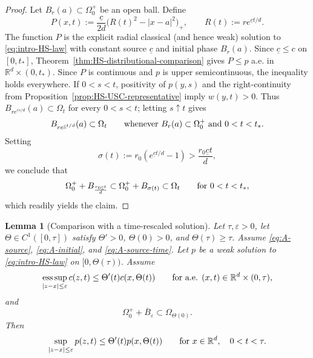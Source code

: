 \documentclass[11pt]{amsart}
\numberwithin{equation}{section}
\numberwithin{figure}{section}
\theoremstyle{plain}
\newtheorem{lem}[thm]{Lemma}
\theoremstyle{definition}
\theoremstyle{remark}
\theoremstyle{plain}
\newcommand{\abs}[1]{\lvert #1 \rvert}
\newcommand{\vep}{\varepsilon}
\def\R{\mathbb{R}}
\begin{document}
\begin{proof}
Let \(B_r(a)\subset\Omega_0^{+}\) be an open ball.  Define
\begin{equation}\label{eq:HS-explicit-ball-solution}
    P(x,t):=\frac{\underline c}{2d}
    \bigl(R(t)^2-\abs{x-a}^2\bigr)_+,
    \qquad
    R(t):=re^{\underline c t/d}.
\end{equation}
The function \(P\) is the explicit radial classical (and hence weak) solution to
\eqref{eq:intro-HS-law} with constant source \(\underline c\) and initial
phase \(B_r(a)\).  Since \(\underline c\)\(\leq c\) on
\([0,t_*]\),
Theorem~\ref{thm:HS-distributional-comparison} gives
\(P\leq p\) a.e. in \(\R^d\times(0,t_*)\).  Since \(P\) is continuous and
\(p\) is upper semicontinuous,
the inequality holds everywhere.  If \(0<s<t\), positivity of \(p(y,s)\) and
the right-continuity from Proposition~\ref{prop:HS-USC-representative} imply
\(w(y,t)>0\). Thus \(B_{re^{\underline cs/d}}(a)\subset\Omega_t\) for every \(0<s<t\);
letting \(s\uparrow t\) gives
\begin{equation}\label{eq:HS-ball-contained}
    B_{re^{\underline c t/d}}(a)\subset\Omega_t
    \qquad\hbox{whenever }B_r(a)\subset\Omega_0^{+}
    \hbox{ and }0<t<t_* .
\end{equation}
Setting
\begin{equation}\label{eq:HS-sigma-expansion-def}
    \sigma(t):=r_0(e^{\underline c t/d}-1)> \frac{r_0 \underline ct}{d},
\end{equation}
we conclude that
\begin{equation}\label{eq:HS-initial-phase-expands}
    \Omega_0^{+}+B_{\frac{r_0 \underline ct}{d}}\subset \Omega_0^{+}+B_{\sigma(t)}\subset\Omega_t
    \qquad\hbox{for }0<t<t_* ,
\end{equation}
which readily yields the claim.
\end{proof}

\begin{lem}[Comparison with a time-rescaled solution]\label{lem:HS-time-rescaled-comparison}
Let \(\tau,\vep>0\), let \(\Theta\in C^1([0,\tau])\) satisfy
\(\Theta'>0\), \(\Theta(0)>0\), and \(\Theta(\tau)\geq\tau\).
Assume \eqref{eq:A-source}, \eqref{eq:A-initial}, and \eqref{eq:A-source-time}.
Let \(p\) be a weak solution to
\eqref{eq:intro-HS-law} on \([0,\Theta(\tau))\).
Assume
\begin{equation}\label{eq:HS-source-Theta-compatibility}
    \operatorname*{ess\,sup}_{\abs{z-x}\leq\vep}c(z,t)
    \leq \Theta'(t)c(x,\Theta(t))
    \qquad\hbox{for a.e. }(x,t)\in\R^d\times(0,\tau),
\end{equation}
and
\begin{equation}\label{eq:HS-initial-Theta-compatibility}
    \Omega_0^{+}+\overline B_\vep\subset\Omega_{\Theta(0)}.
\end{equation}
Then
\begin{equation}\label{eq:HS-time-rescaled-pressure-comparison}
    \sup_{\abs{z-x}\leq\vep}p(z,t)
    \leq \Theta'(t)p(x,\Theta(t))
    \qquad\hbox{for }x\in\R^d,\quad 0<t<\tau .
\end{equation}
\end{lem}
\end{document}
